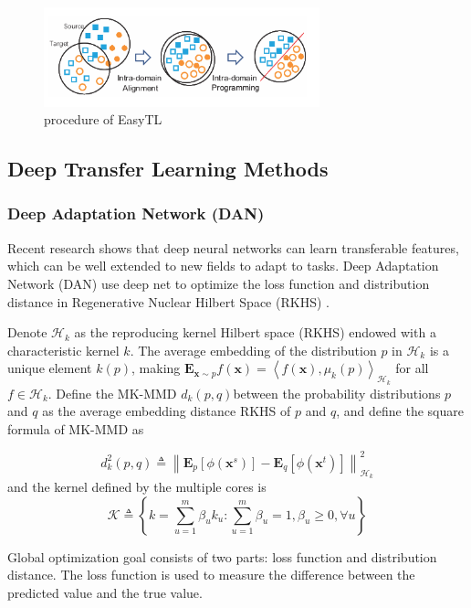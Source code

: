 \documentclass[conference]{IEEEtran}
\begin{document}
\begin{center}
	\begin{figure}[htbp]
		\centering
		\label{kFig1}
		\includegraphics[width=8cm]{image/easyTL.png}
		\caption{procedure of EasyTL\cite{Wang2019Easy}}
	\end{figure}
\end{center}

\subsection{Deep Transfer Learning Methods}

\subsubsection{Deep Adaptation Network (DAN)}

Recent research shows that deep neural networks can learn transferable features, which can be well extended to new fields to adapt to tasks. Deep Adaptation Network (DAN) use deep net to optimize the loss function and distribution distance in Regenerative Nuclear Hilbert Space (RKHS) \cite{Long2015Learning}.

Denote $\mathcal{H}_{k}$ as the reproducing kernel Hilbert space (RKHS) endowed with a characteristic kernel $k$. The average embedding of the distribution $p$ in $\mathcal{H}_{k}$ is a unique element $k(p)$, making $\mathbf{E}_{\mathbf{x} \sim p} f(\mathbf{x})=\left\langle f( \mathbf{x}), \mu_{k}(p)\right\rangle_{\mathcal{H}_{k}}$ for all $f \in \mathcal{H}_{k}$. Define the MK-MMD $d_{k}(p, q)$between the probability distributions $p$ and $q$ as the average embedding distance RKHS of $p$ and $q$, and define the square formula of MK-MMD as

$$
d_{k}^{2}(p, q) \triangleq\left\|\mathbf{E}_{p}\left[\phi\left(\mathbf{x}^{s}\right)\right]-\mathbf{E}_{q}\left[\phi\left(\mathbf{x}^{t}\right)\right]\right\|_{\mathcal{H}_{k}}^{2}
$$
and the kernel defined by the multiple cores is
$$
\mathcal{K} \triangleq\left\{k=\sum_{u=1}^{m} \beta_{u} k_{u}: \sum_{u=1}^{m} \beta_{u}=1, \beta_{u} \geqslant 0, \forall u\right\}
$$

Global optimization goal consists of two parts: loss function and distribution distance. The loss function is used to measure the difference between the predicted value and the true value.
\end{document}
